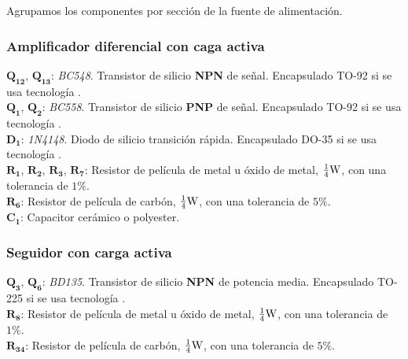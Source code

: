 
\vspace{1.5cm}


Agrupamos los componentes por sección de la fuente de alimentación.

\subsubsection{Amplificador diferencial con caga activa}

$\bm{Q_{12}}$, $\bm{Q_{13}}$: \textit{BC548}. Transistor de silicio \textbf{NPN} de señal. Encapsulado TO-92 si se usa tecnología .\\

$\bm{Q_{1}}$, $\bm{Q_{2}}$: \textit{BC558}. Transistor de silicio \textbf{PNP} de señal. Encapsulado TO-92 si se usa tecnología .\\

$\bm{D_{1}}$: \textit{1N4148}. Diodo de silicio transición rápida. Encapsulado DO-35 si se usa tecnología .\\

$\bm{R_{1}}$, $\bm{R_{2}}$, $\bm{R_{3}}$, $\bm{R_{7}}$: Resistor de película de metal u óxido de metal, $\frac{1}{4} \si[per-mode=symbol]{\watt}$, con una tolerancia de $1 \%$.\\

$\bm{R_{6}}$: Resistor de película de carbón, $\frac{1}{4} \si[per-mode=symbol]{\watt}$, con una tolerancia de $5 \%$.\\

$\bm{C_{1}}$: Capacitor cerámico o polyester.\\


\subsubsection{Seguidor con carga activa}

$\bm{Q_{3}}$, $\bm{Q_{6}}$: \textit{BD135}. Transistor de silicio \textbf{NPN} de potencia media. Encapsulado TO-225 si se usa tecnología .\\
$\bm{R_{8}}$: Resistor de película de metal u óxido de metal, $\frac{1}{4} \si[per-mode=symbol]{\watt}$, con una tolerancia de $1 \%$.\\

$\bm{R_{34}}$: Resistor de película de carbón, $\frac{1}{4} \si[per-mode=symbol]{\watt}$, con una tolerancia de $5 \%$.\\



